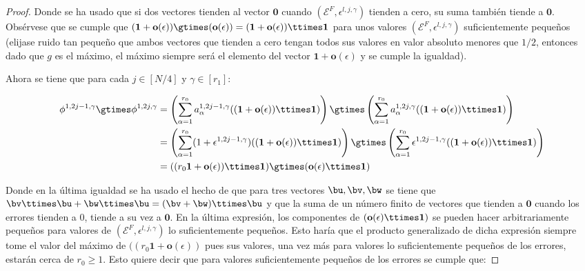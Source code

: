 \begin{proof}
Donde se ha usado que si dos vectores tienden al vector $\mathbf{0}$ cuando $(\mathcal{E}^F,\epsilon^{l,j,\gamma})$ tienden a cero, su suma también tiende a $\mathbf{0}$. Obsérvese que se cumple que $(\mathbf{1} + \textbf{o}(\epsilon))\gtimes(\textbf{o}(\epsilon)) = (\mathbf{1} + \textbf{o}(\epsilon))\ttimes\mathbf{1}$ para unos valores $(\mathcal{E}^F,\epsilon^{l,j,\gamma})$ suficientemente pequeños (elijase ruido tan pequeño que ambos vectores que tienden a cero tengan todos sus valores en valor absoluto menores que $1/2$, entonces dado que $g$ es el máximo, el máximo siempre será el elemento del vector $\mathbf{1}+\textbf{o}(\epsilon)$ y se cumple la igualdad).

Ahora se tiene que para cada $j\in [N/4]$ y $\gamma \in [r_1]$:

\begin{align*}
\phi^{1,2j-1,\gamma} \gtimes \phi^{1,2j,\gamma} &= \left( \sum^{r_0}_{\alpha=1}a_\alpha^{1,2j-1,\gamma}((\mathbf{1} + \textbf{o}(\epsilon))\ttimes\mathbf{1}) \right) \gtimes \left( \sum^{r_0}_{\alpha=1}a_\alpha^{1,2j,\gamma}((\mathbf{1} + \textbf{o}(\epsilon))\ttimes\mathbf{1}) \right) \\
&= \left( \sum^{r_0}_{\alpha=1}(1 + \epsilon^{1,2j-1,\gamma})((\mathbf{1} + \textbf{o}(\epsilon))\ttimes\mathbf{1}) \right) \gtimes \left( \sum^{r_0}_{\alpha=1}\epsilon^{1,2j-1,\gamma}((\mathbf{1} + \textbf{o}(\epsilon))\ttimes\mathbf{1}) \right) \\
&= ((r_0 \mathbf{1} + \textbf{o}(\epsilon))\ttimes \mathbf{1})\gtimes (\textbf{o}(\epsilon)\ttimes \mathbf{1})
\end{align*}

Donde en la última igualdad se ha usado el hecho de que para tres vectores $\bu,\bv,\bw$ se tiene que $\bv \ttimes \bu + \bw \ttimes \bu = (\bv + \bw) \ttimes \bu$ y que la suma de un número finito de vectores que tienden a $\mathbf{0}$ cuando los errores tienden a $0$, tiende a su vez a $\mathbf{0}$. En la última expresión, los componentes de $(\textbf{o}(\epsilon)\ttimes \mathbf{1})$ se pueden hacer arbitrariamente pequeños para valores de $(\mathcal{E}^F,\epsilon^{l,j,\gamma})$ lo suficientemente pequeños. Esto haría que el producto generalizado de dicha expresión siempre tome el valor del máximo de $((r_0 \mathbf{1} + \textbf{o}(\epsilon))$ pues sus valores, una vez más para valores lo suficientemente pequeños de los errores, estarán cerca de $r_0 \geq 1$. Esto quiere decir que para valores suficientemente pequeños de los errores se cumple que:


\end{proof}
